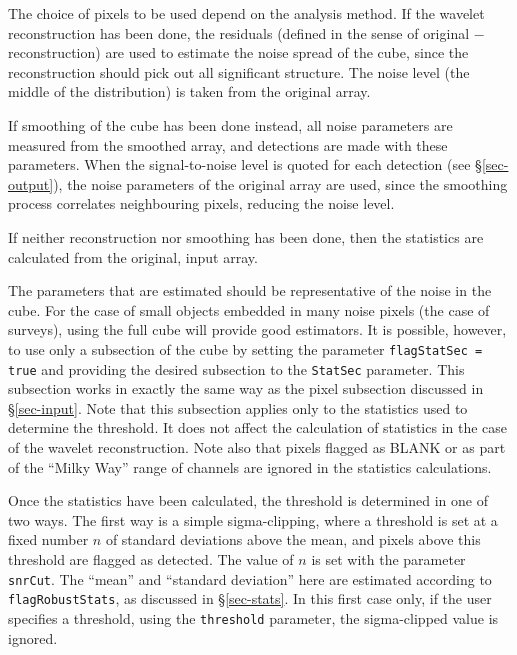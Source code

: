 The choice of pixels to be used depend on the analysis method. If the
wavelet reconstruction has been done, the residuals (defined
in the sense of original $-$ reconstruction) are used to estimate the
noise spread of the cube, since the reconstruction should pick out
all significant structure. The noise level (the middle of the
distribution) is taken from the original array.

If smoothing of the cube has been done instead, all noise parameters
are measured from the smoothed array, and detections are made with
these parameters. When the signal-to-noise level is quoted for each
detection (see \S\ref{sec-output}), the noise parameters of the
original array are used, since the smoothing process correlates
neighbouring pixels, reducing the noise level.

If neither reconstruction nor smoothing has been done, then the
statistics are calculated from the original, input array. 

The parameters that are estimated should be representative of the
noise in the cube. For the case of small objects embedded in many
noise pixels (\eg the case of \hi surveys), using the full cube will
provide good estimators. It is possible, however, to use only a
subsection of the cube by setting the parameter \texttt{flagStatSec =
  true} and providing the desired subsection to the \texttt{StatSec}
parameter. This subsection works in exactly the same way as the pixel
subsection discussed in \S\ref{sec-input}. Note that this subsection
applies only to the statistics used to determine the threshold. It
does not affect the calculation of statistics in the case of the
wavelet reconstruction. Note also that pixels flagged as BLANK or as
part of the ``Milky Way'' range of channels are ignored in the
statistics calculations.


Once the statistics have been calculated, the threshold is determined
in one of two ways. The first way is a simple sigma-clipping, where a
threshold is set at a fixed number $n$ of standard deviations above
the mean, and pixels above this threshold are flagged as detected. The
value of $n$ is set with the parameter \texttt{snrCut}. The ``mean''
and ``standard deviation'' here are estimated according to
\texttt{flagRobustStats}, as discussed in \S\ref{sec-stats}. In this
first case only, if the user specifies a threshold, using the
\texttt{threshold} parameter, the sigma-clipped value is ignored.

